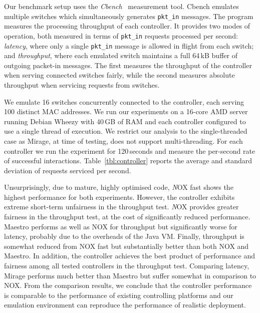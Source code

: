 Our benchmark setup uses the {\it Cbench}~\cite{cbench} measurement tool. Cbench
emulates multiple switches which simultaneously generates {\tt pkt\_in} messages.
The program measures the processing throughput of each controller.
It provides two modes of operation, both measured in terms of {\tt pkt\_in}
requests processed per second: {\it latency}, where only a single
{\tt pkt\_in} message is allowed in flight from each switch; and
{\it throughput}, where each emulated switch maintains a full 64\,kB buffer of outgoing
packet-in messages. The first measures the throughput of the controller when
serving connected switches fairly, while the second measures absolute throughput
when servicing requests from switches.
                                                                       
We emulate 16 switches concurrently connected to the controller, each serving
100 distinct MAC addresses. We run our experiments on a 16-core AMD server
running Debian Wheezy with 40\,GB of RAM and each controller configured to use a
single thread of execution. We restrict our analysis to the single-threaded case
as Mirage, at time of testing, does not support multi-threading. For each
controller we run the experiment for 120\,seconds and measure the per-second
rate of successful interactions. Table~\ref{tbl:controller} reports the average
and standard deviation of requests serviced per second.

Unsurprisingly, due to mature, highly optimised code, {\emph NOX fast} shows the
highest performance for both experiments. However, the controller exhibits
extreme short-term unfairness in the throughput test.  {\emph NOX} provides
greater fairness in the throughput test, at the cost of significantly reduced
performance. Maestro performs as well as NOX for throughput but significantly
worse for latency, probably due to the overheads of the Java VM.  Finally,
\mirage throughput is somewhat reduced from NOX fast but substantially better
than both NOX and Maestro. In addition, the \mirage controller achieves the best
product of performance and fairness among all tested controllers in the
throughput test.  Comparing latency, Mirage performs much better than Maestro
but suffer somewhat in comparison to NOX. From the comparison results, we
conclude that the \mirage controller performance is comparable to the performance of
existing controlling platforms and our emulation environment can reproduce
the performance of realistic \of deployment. 


